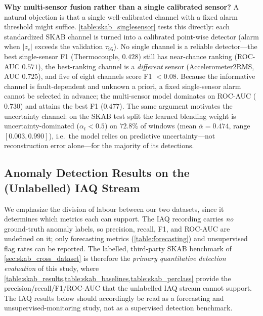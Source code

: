 

\textbf{Why multi-sensor fusion rather than a single calibrated sensor?} A natural objection is that a single well-calibrated channel with a fixed alarm threshold might suffice. \cref{table:skab_singlesensor} tests this directly: each standardized SKAB channel is turned into a calibrated point-wise detector (alarm when $|z_c|$ exceeds the validation $\tau_{95}$). No single channel is a reliable detector---the best single-sensor F1 (Thermocouple, $0.428$) still has near-chance ranking (ROC-AUC $0.571$), the best-ranking channel is a \emph{different} sensor (Accelerometer2RMS, AUC $0.725$), and five of eight channels score F1 $<0.08$. Because the informative channel is fault-dependent and unknown a priori, a fixed single-sensor alarm cannot be selected in advance; the multi-sensor model dominates on ROC-AUC ($0.730$) and attains the best F1 ($0.477$). The same argument motivates the uncertainty channel: on the SKAB test split the learned blending weight is uncertainty-dominated ($\alpha_t < 0.5$) on $72.8\%$ of windows (mean $\bar\alpha = 0.474$, range $[0.003, 0.990]$), i.e.\ the model relies on predictive uncertainty---not reconstruction error alone---for the majority of its detections.



\subsection{Anomaly Detection Results on the (Unlabelled) IAQ Stream}

We emphasize the division of labour between our two datasets, since it determines which metrics each can support. The IAQ recording carries \emph{no} ground-truth anomaly labels, so precision, recall, F1, and ROC-AUC are undefined on it; only forecasting metrics (\cref{table:forecasting}) and unsupervised flag rates can be reported. The labelled, third-party SKAB benchmark of \cref{sec:skab_cross_dataset} is therefore the \emph{primary quantitative detection evaluation} of this study, where \cref{table:skab_results,table:skab_baselines,table:skab_perclass} provide the precision/recall/F1/ROC-AUC that the unlabelled IAQ stream cannot support. The IAQ results below should accordingly be read as a forecasting and unsupervised-monitoring study, not as a supervised detection benchmark.

